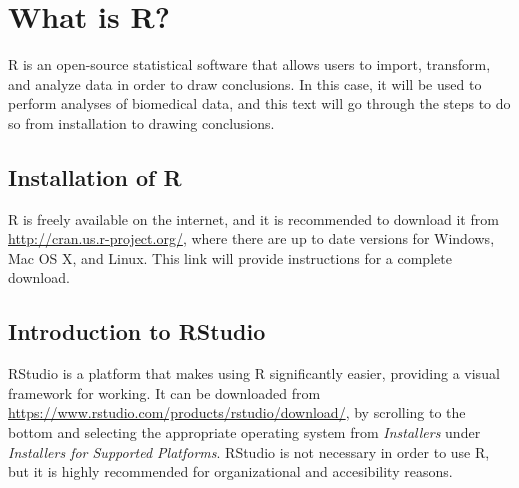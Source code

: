 \documentclass{report}\usepackage[]{graphicx}\usepackage[]{color}
\begin{document}
\section{What is \textsf{R}?}
\textsf{R} is an open-source statistical software that allows users to import, transform, and analyze data in order to draw conclusions.  In this case, it will be used to perform analyses of biomedical data, and this text will go through the steps to do so from installation to drawing conclusions.  

\subsection{Installation of \textsf{R}}
\textsf{R} is freely available on the internet, and it is recommended to download it from \url{http://cran.us.r-project.org/}, where there are up to date versions for Windows, Mac OS X, and Linux.  This link will provide instructions for a complete download.  

\subsection{Introduction to RStudio}
\textsf{RStudio} is a platform that makes using \textsf{R} significantly easier, providing a visual framework for working. It can be downloaded from \url{https://www.rstudio.com/products/rstudio/download/}, by scrolling to the bottom and selecting the appropriate operating system from \textit{Installers} under \textit{Installers for Supported Platforms}.  \textsf{RStudio} is not necessary in order to use \textsf{R}, but it is highly recommended for organizational and accesibility reasons.      
\end{document}
